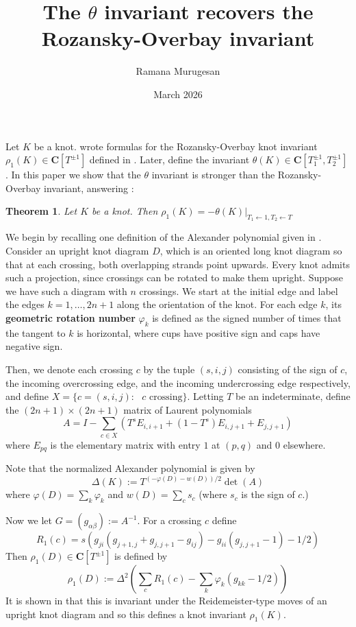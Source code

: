 \documentclass{amsart}
\title{The $\theta$ invariant recovers the Rozansky-Overbay invariant}
\author{Ramana Murugesan}
\date{March 2026}
\newtheorem{theorem}{Theorem}
\begin{document}
\maketitle

Let $K$ be a knot. \cite{pai} wrote formulas for the Rozansky-Overbay knot
invariant $\rho_1(K)\in\mathbf C[T^{\pm1}]$ defined in \cites{Ro1,Ro2,Ro3,Ov}.
Later, \cite{theta} define the invariant $\theta(K)\in\mathbf C[T_1^{\pm1},T_2^{\pm1}]$.
In this paper we show that the $\theta$ invariant is stronger than the Rozansky-Overbay invariant,
answering \cite[Conjecture 24]{theta}:
\begin{theorem}\label{thm:main}
    Let $K$ be a knot. Then $\rho_1(K)=-\theta(K)|_{T_1\leftarrow 1,T_2\leftarrow T}$
\end{theorem}

We begin by recalling one definition of the Alexander polynomial given in \cite{pai}.
Consider
an upright knot diagram $D$, which is an oriented long knot diagram so that at each crossing,
both overlapping strands point upwards. Every knot admits such a projection, since
crossings can be rotated to make them upright. Suppose we have such a diagram with
$n$ crossings. We start at the initial edge and label the edges $k=1,\ldots,2n+1$ along
the orientation of the knot.
    For each edge $k$, its \textbf{geometric rotation number} $\varphi_k$ is defined as the signed
    number of times that the tangent to $k$ is horizontal, where cups have positive sign and
    caps have negative sign.

Then, we denote each crossing $c$ by the tuple $(s,i,j)$ consisting of
the sign of $c$, the incoming 
overcrossing edge, and the incoming undercrossing edge respectively, and
define $X=\{c=(s,i,j):\text{ $c$ crossing}\}$. Letting $T$ be an indeterminate,
define the $(2n+1)\times(2n+1)$ matrix of Laurent polynomials
\begin{equation}
    A=I-\sum_{c\in X} (T^s E_{i,i+1}+(1-T^s)E_{i,j+1}+E_{j,j+1}) \label{A}
\end{equation}
where $E_{pq}$ is the elementary matrix with entry $1$ at $(p,q)$ and $0$ elsewhere.

Note that the normalized Alexander
polynomial is given by \[\Delta(K):=T^{(-\varphi(D)-w(D))/2}\det(A)\] where
$\varphi(D)=\sum_k \varphi_k$ and $w(D)=\sum_c s_c$ (where $s_c$ is the sign of $c$.)

Now we let $G=(g_{\alpha\beta}):=A^{-1}$. For a crossing $c$ define
\[R_1(c)=s(g_{ji}(g_{j+1,j}+g_{j,j+1}-g_{ij})-g_{ii}(g_{j,j+1}-1)-1/2)\]
Then $\rho_1(D)\in\mathbf C[T^{\pm1}]$ is defined by 
\[\rho_1(D):=\Delta^2\left(\sum_c R_1(c)-\sum_k\varphi_k(g_{kk}-1/2)\right)\]
It is shown in \cite{pai} that this is invariant under the Reidemeister-type moves of
an upright knot diagram and so this defines a knot invariant $\rho_1(K)$.
\end{document}
